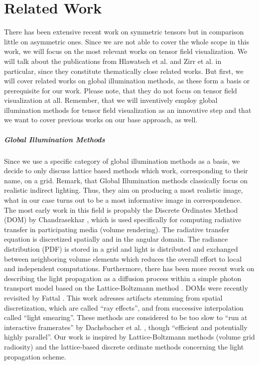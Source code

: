 \documentclass{scrartcl}
\begin{document}
\chapter{Related Work}
\label{chap:related}

There has been extensive recent work on symmetric tensors but in comparison little on asymmetric ones. Since we are not able to cover the whole scope in this work, we will focus on the most relevant works on tensor field visualization. We will talk about the publications from Hlawatsch et al. \cite{hlawatsch} and Zirr et al. \cite{zirr} in particular, since they constitute thematically close related works. But first, we will cover related works on global illumination methods, as these form a basis or prerequisite for our work. Please note, that they do not focus on tensor field visualization at all. Remember, that we will inventively employ global illumination methods for tensor field visualization as an innovative step and that we want to cover previous works on our base approach, as well.

\paragraph{Global Illumination Methods}
Since we use a specific category of global illumination methods as a basis, we decide to only discuss lattice based methods which work, corresponding to their name, on a grid. Remark, that Global Illumination methods classically focus on realistic indirect lighting. Thus, they aim on producing a most realistic image, what in our case turns out to be a most informative image in correspondence. The most early work in this field is propably the Discrete Ordinates Method (DOM) by Chandrasekhar \cite{Chandrasekhar}, which is used specifically for computing radiative transfer in participating media (volume rendering). The radiative transfer equation is discretized spatially and in the angular domain. The radiance distribution (PDF) is stored in a grid and light is distributed and exchanged between neighboring volume elements which reduces the overall effort to local and independent computations. Furthermore, there has been more recent work on describing the light propagation as a diffusion process within a simple photon transport model based on the Lattice-Boltzmann method \cite{geist}. DOMs were recently revisited by Fattal \cite{fattal}. This work adresses artifacts stemming from spatial discretization, which are called \enquote{ray effects}, and from successive interpolation called \enquote{light smearing}. These methods are considered to be too slow to \enquote{run at interactive framerates} by Dachsbacher et al. \cite{dachsbacher}, though \enquote{efficient and potentially highly parallel}. Our work is inspired by Lattice-Boltzmann methods (volume grid radiosity) and the lattice-based discrete ordinate methods concerning the light propagation scheme.
\end{document}
